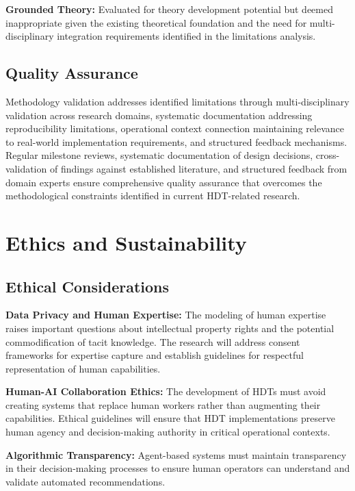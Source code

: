 \documentclass[12pt,a4paper]{article}
\begin{document}
\noindent \textbf{Grounded Theory:} Evaluated for theory development potential but deemed inappropriate given the existing theoretical foundation and the need for multi-disciplinary integration requirements identified in the limitations analysis.

\subsection{Quality Assurance}

Methodology validation addresses identified limitations through multi-disciplinary validation across research domains, systematic documentation addressing reproducibility limitations, operational context connection maintaining relevance to real-world implementation requirements, and structured feedback mechanisms. Regular milestone reviews, systematic documentation of design decisions, cross-validation of findings against established literature, and structured feedback from domain experts ensure comprehensive quality assurance that overcomes the methodological constraints identified in current HDT-related research.

\section{Ethics and Sustainability}
\label{sec:ethics}

\subsection{Ethical Considerations}

\noindent \textbf{Data Privacy and Human Expertise:} The modeling of human expertise raises important questions about intellectual property rights and the potential commodification of tacit knowledge. The research will address consent frameworks for expertise capture and establish guidelines for respectful representation of human capabilities.

\noindent \textbf{Human-AI Collaboration Ethics:} The development of HDTs must avoid creating systems that replace human workers rather than augmenting their capabilities. Ethical guidelines will ensure that HDT implementations preserve human agency and decision-making authority in critical operational contexts.

\noindent \textbf{Algorithmic Transparency:} Agent-based systems must maintain transparency in their decision-making processes to ensure human operators can understand and validate automated recommendations.
\end{document}
